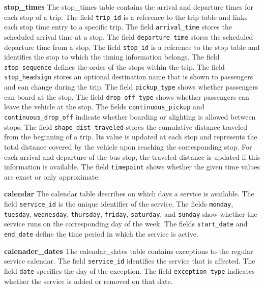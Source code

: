 \par\medskip
\noindent\textbf{stop\_times} \quad
The stop\_times table contains the arrival and departure times for each stop of a trip. The field \texttt{trip\_id} is a reference to the trip table and links each stop time entry to a specific trip. The field \texttt{arrival\_time} stores the scheduled arrival time at a stop. The field \texttt{departure\_time} stores the scheduled departure time from a stop. The field \texttt{stop\_id} is a reference to the stop table and identifies the stop to which the timing information belongs. The field \texttt{stop\_sequence} defines the order of the stops within the trip. The field \texttt{stop\_headsign} stores an optional destination name that is shown to passengers and can change during the trip. The field \texttt{pickup\_type} shows whether passengers can board at the stop. The field \texttt{drop\_off\_type} shows whether passengers can leave the vehicle at the stop. The fields \texttt{continuous\_pickup} and \texttt{continuous\_drop\_off} indicate whether boarding or alighting is allowed between stops. The field \texttt{shape\_dist\_traveled} stores the cumulative distance traveled from the beginning of a trip. Its value is updated at each stop and represents the total distance covered by the vehicle upon reaching the corresponding stop. For each arrival and departure of the bus stop, the traveled distance is updated if this information is available. The field \texttt{timepoint} shows whether the given time values are exact or only approximate.





\par\medskip
\noindent\textbf{calendar} \quad
The calendar table describes on which days a service is available. The field \texttt{service\_id} is the unique identifier of the service. The fields \texttt{monday}, \texttt{tuesday}, \texttt{wednesday}, \texttt{thursday}, \texttt{friday}, \texttt{saturday}, and \texttt{sunday} show whether the service runs on the corresponding day of the week. The fields \texttt{start\_date} and \texttt{end\_date} define the time period in which the service is active.


\par\medskip
\noindent\textbf{calenader\_dates} \quad
The calendar\_dates table contains exceptions to the regular service calendar. The field \texttt{service\_id} identifies the service that is affected. The field \texttt{date} specifies the day of the exception. The field \texttt{exception\_type} indicates whether the service is added or removed on that date.

